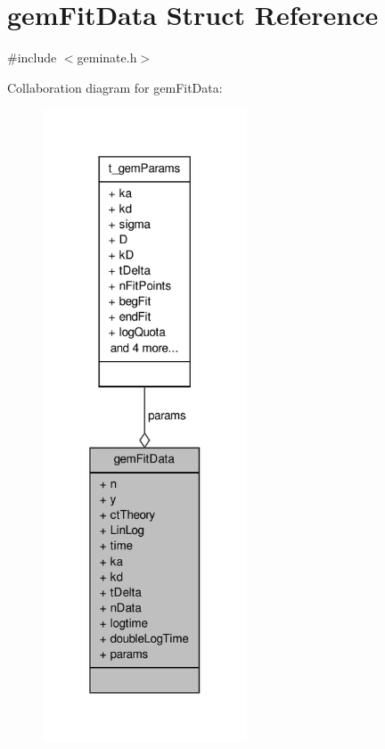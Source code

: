 \hypertarget{structgemFitData}{\section{gem\-Fit\-Data \-Struct \-Reference}
\label{structgemFitData}
}


{\ttfamily \#include $<$geminate.\-h$>$}



\-Collaboration diagram for gem\-Fit\-Data\-:
\nopagebreak
\begin{figure}[H]
\begin{center}
\leavevmode
\includegraphics[width=172pt]{structgemFitData__coll__graph}
\end{center}
\end{figure}
